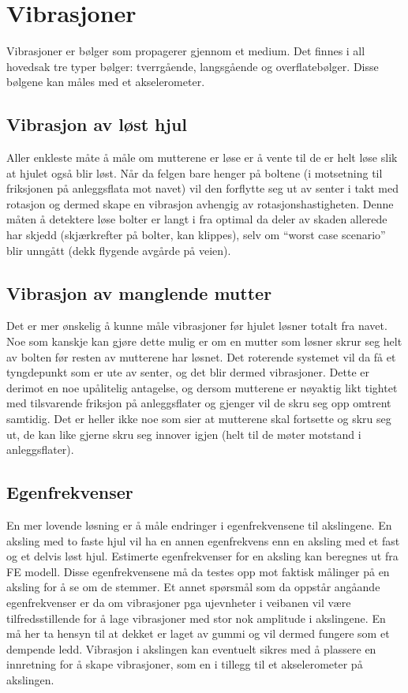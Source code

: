 \section{Vibrasjoner}
Vibrasjoner er bølger som propagerer gjennom et medium. Det finnes i 
all hovedsak tre typer bølger: tverrgående, langsgående og overflatebølger. 
Disse bølgene kan måles med et akselerometer.

\subsection{Vibrasjon av løst hjul}
Aller enkleste måte å måle om mutterene er løse er å vente til 
de er helt løse slik at hjulet også blir løst. Når da felgen bare 
henger på boltene (i motsetning til friksjonen på anleggsflata 
mot navet) vil den forflytte seg ut av senter i takt med rotasjon 
og dermed skape en vibrasjon avhengig av rotasjonshastigheten. 
Denne måten å detektere løse bolter er langt i fra optimal da deler 
av skaden allerede har skjedd (skjærkrefter på bolter, kan klippes),
 selv om ``worst case scenario'' blir unngått (dekk flygende avgårde på veien).

\subsection{Vibrasjon av manglende mutter}
Det er mer ønskelig å kunne måle vibrasjoner før hjulet løsner totalt
fra navet. Noe som kanskje kan gjøre dette mulig er om en mutter som løsner
skrur seg helt av bolten før resten av mutterene har løsnet. Det roterende systemet vil
da få et tyngdepunkt som er ute av senter, og det blir dermed vibrasjoner.
Dette er derimot en noe upålitelig antagelse, og dersom mutterene er nøyaktig
likt tightet med tilsvarende friksjon på anleggsflater og gjenger vil de skru seg opp omtrent samtidig.
Det er heller ikke noe som sier at mutterene skal fortsette og skru seg ut, de kan like 
gjerne skru seg innover igjen (helt til de møter motstand i anleggsflater).

\subsection{Egenfrekvenser}
En mer lovende løsning er å måle endringer i egenfrekvensene til 
akslingene. En aksling med to faste hjul vil ha en annen egenfrekvens 
enn en aksling med et fast og et delvis løst hjul. Estimerte egenfrekvenser 
for en aksling kan beregnes ut fra FE modell. Disse egenfrekvensene må %
da testes opp mot faktisk målinger på en aksling for å se om de stemmer. 
Et annet spørsmål som da oppstår angåande egenfrekvenser er da om 
vibrasjoner pga ujevnheter i veibanen vil være tilfredsstillende for å lage 
vibrasjoner med stor nok amplitude i akslingene. En må her ta hensyn til 
at dekket er laget av gummi og vil dermed fungere som et dempende ledd. 
Vibrasjon i akslingen kan eventuelt sikres med å plassere en innretning for 
å skape vibrasjoner, som en i tillegg til et akselerometer på akslingen.
